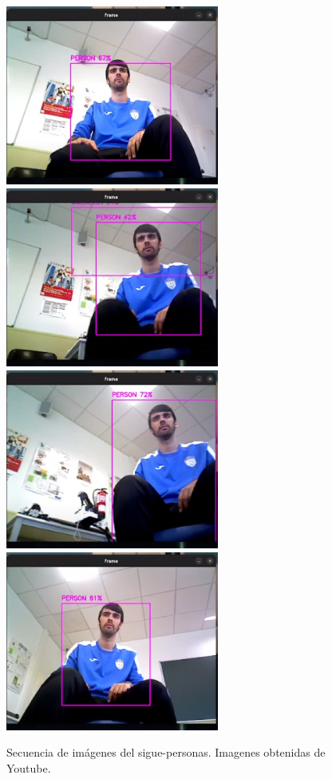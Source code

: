 \begin{figure} [H]
    \begin{center}
        \includegraphics[width=7cm]{figs/c5/sec_rot1.png}
        \includegraphics[width=7cm]{figs/c5/sec_rot2.png}
        \includegraphics[width=7cm]{figs/c5/sec_rot3.png}
        \includegraphics[width=7cm]{figs/c5/sec_rot4.png}
    \end{center}
    \caption[Secuencia sigue-personas rotación]{Secuencia de imágenes del sigue-personas. Imagenes obtenidas de Youtube\footnotemark.}
    \label{fig:sec_FP_rot}
\end{figure}

